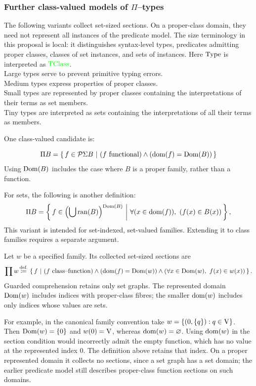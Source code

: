 \subsubsection{Further class-valued models of $\Pi$--types}
The following variants collect set-sized sections. On a proper-class domain,
they need not represent all instances of the predicate model. The size
terminology in this proposal is local: it distinguishes syntax-level types,
predicates admitting proper classes, classes of set instances, and sets of
instances.
Here $\mathrm{Type}$ is interpreted as ${\text{\textcolor{green}{TClass}}}$.\\
Large types serve to prevent primitive typing errors.\\
Medium types express properties of proper classes.\\
Small types are represented by proper classes containing the
interpretations of their terms as set members.\\
Tiny types are interpreted as sets containing the interpretations of
all their terms as members.

One class-valued candidate is:
\begin{definition}
\[
\Pi B = \left\{\,f\in \mathcal{P} \Sigma B \ \middle|\  (f\mathrm{\ functional}) \land (\mathrm{dom}(f)=\mathrm{Dom}(B)) \,\right\}
\]
Using $\mathrm{Dom}(B)$ includes the case where $B$ is a proper family,
rather than a function.
\end{definition}
\begin{definition}
For sets, the following is another definition:
\[
\Pi B = \left\{\,f\in \left(\bigcup\mathrm{ran}(B)\right)^{\mathrm{Dom}(B)}\ \middle|\ \forall (x\in\mathrm{dom}(f)) ,\ (f(x) \in B(x))\,\right\},
\]
This variant is intended for set-indexed, set-valued families. Extending
it to class families requires a separate argument.
\end{definition}

\begin{definition}
Let $w$ be a specified family. Its collected set-sized sections are
\[
\prod w \,{\stackrel{{\textrm{def.}}}{\coloneqq}}\, \left\{\,f\ \middle|\ (f\text{ class--function})
 \land (\mathrm{dom}(f)=\mathrm{Dom}(w))
 \land (\forall x\in\mathrm{Dom}(w),\ f(x)\in w(x))\,\right\}.
\]
Guarded comprehension retains only set graphs. The represented domain
$\mathrm{Dom}(w)$ includes indices with proper-class fibres; the smaller
$\mathrm{dom}(w)$ includes only indices whose values are sets.
\end{definition}
For example, in the canonical family convention take
$w=\{(0,\{q\}):q\in\mathrm{V}\}$. Then $\mathrm{Dom}(w)=\{0\}$ and
$w(0)=\mathrm{V}$, whereas $\mathrm{dom}(w)=\varnothing$. Using $\mathrm{dom}(w)$ in
the section condition would incorrectly admit the empty function,
which has no value at the represented index $0$. The definition above
retains that index. On a proper represented domain it collects no
sections, since a set graph has a set domain; the earlier predicate
model still describes proper-class function sections on such domains.


